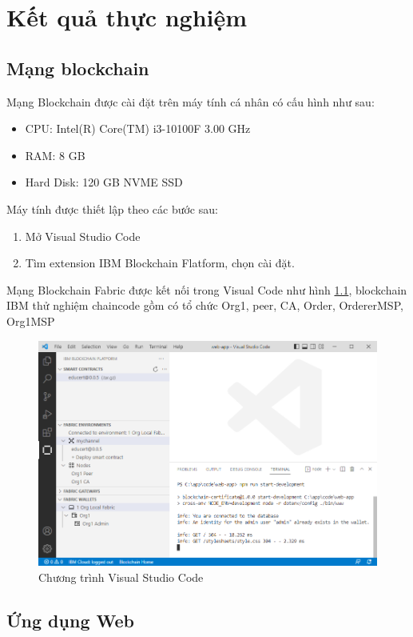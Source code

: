 \chapter{Kết quả thực nghiệm}
\section{Mạng blockchain}

Mạng Blockchain được cài đặt  trên máy tính cá nhân có cấu hình như sau:
\begin{itemize}
\item CPU: Intel(R) Core(TM) i3-10100F 3.00 GHz
\item RAM: 8 GB
\item Hard Disk: 120 GB NVME SSD
\end{itemize}

Máy tính được thiết lập theo các bước sau:
\begin{enumerate}
\item Mở Visual Studio Code 
\item Tìm extension IBM Blockchain Flatform, chọn cài đặt.
\end{enumerate}
Mạng Blockchain Fabric được kết nối trong Visual Code như hình \ref{fig:ide_start}, blockchain IBM thử nghiệm chaincode gồm có tổ chức Org1, peer, CA, Order, OrdererMSP, Org1MSP

\begin{figure}[htbp]
\centering
\includegraphics[width=.9\linewidth]{img/ide_start.PNG}
\caption{Chương trình Visual Studio Code}
\label{fig:ide_start}
\end{figure}

\section{Ứng dụng Web}

